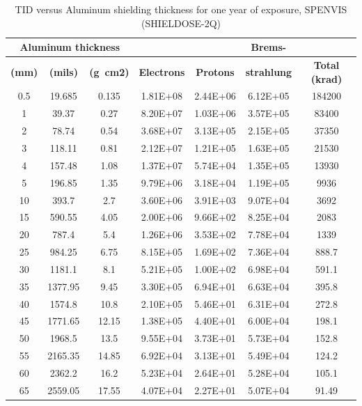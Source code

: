 \begin{table}[htbp]
  \centering
  
    \begin{tabular}{|c|c|c|c|c|c|c|}
    \hline
    \multicolumn{3}{|c|}{\textbf{Aluminum thickness}} &       &       & \textbf{Brems- } &  \bigstrut\\
    \hline
    \textbf{(mm)} & \textbf{(mils)} & \textbf{(g cm2)} & \textbf{Electrons} & \textbf{Protons} & \textbf{strahlung} & \textbf{Total (krad)} \bigstrut\\
    \hline
    0.5   & 19.685 & 0.135 & 1.81E+08 & 2.44E+06 & 6.12E+05 & 184200 \bigstrut\\
    \hline
    1     & 39.37 & 0.27  & 8.20E+07 & 1.03E+06 & 3.57E+05 & 83400 \bigstrut\\
    \hline
    2     & 78.74 & 0.54  & 3.68E+07 & 3.13E+05 & 2.15E+05 & 37350 \bigstrut\\
    \hline
    3     & 118.11 & 0.81  & 2.12E+07 & 1.21E+05 & 1.63E+05 & 21530 \bigstrut\\
    \hline
    4     & 157.48 & 1.08  & 1.37E+07 & 5.74E+04 & 1.35E+05 & 13930 \bigstrut\\
    \hline
    5     & 196.85 & 1.35  & 9.79E+06 & 3.18E+04 & 1.19E+05 & 9936 \bigstrut\\
    \hline
    10    & 393.7 & 2.7   & 3.60E+06 & 3.91E+03 & 9.07E+04 & 3692 \bigstrut\\
    \hline
    15    & 590.55 & 4.05  & 2.00E+06 & 9.66E+02 & 8.25E+04 & 2083 \bigstrut\\
    \hline
    20    & 787.4 & 5.4   & 1.26E+06 & 3.53E+02 & 7.78E+04 & 1339 \bigstrut\\
    \hline
    25    & 984.25 & 6.75  & 8.15E+05 & 1.69E+02 & 7.36E+04 & 888.7 \bigstrut\\
    \hline
    30    & 1181.1 & 8.1   & 5.21E+05 & 1.00E+02 & 6.98E+04 & 591.1 \bigstrut\\
    \hline
    35    & 1377.95 & 9.45  & 3.30E+05 & 6.94E+01 & 6.63E+04 & 395.8 \bigstrut\\
    \hline
    40    & 1574.8 & 10.8  & 2.10E+05 & 5.46E+01 & 6.31E+04 & 272.8 \bigstrut\\
    \hline
    45    & 1771.65 & 12.15 & 1.38E+05 & 4.40E+01 & 6.00E+04 & 198.1 \bigstrut\\
    \hline
    50    & 1968.5 & 13.5  & 9.55E+04 & 3.73E+01 & 5.73E+04 & 152.8 \bigstrut\\
    \hline
    55    & 2165.35 & 14.85 & 6.92E+04 & 3.13E+01 & 5.49E+04 & 124.2 \bigstrut\\
    \hline
    60    & 2362.2 & 16.2  & 5.23E+04 & 2.64E+01 & 5.28E+04 & 105.1 \bigstrut\\
    \hline
    65    & 2559.05 & 17.55 & 4.07E+04 & 2.27E+01 & 5.07E+04 & 91.49 \bigstrut\\
    \hline
    \end{tabular}%
    \caption{TID versus Aluminum shielding thickness for one year of exposure, SPENVIS (SHIELDOSE-2Q)}
  \label{tab:thicknessalum}%
\end{table}%


